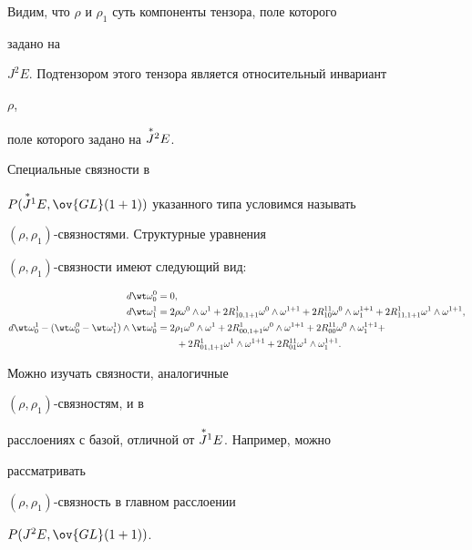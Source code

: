Видим, что $\rho$ и $\rho_1$ суть компоненты тензора, поле которого 


задано на 


$J^2E$. Подтензором этого тензора является относительный инвариант 


$\rho$, 


поле которого задано на $\overset{\,*}{J}{}^2E$. 


 


Специальные связности в 


$P(\up{\,*}{J}^1 E,\ov{GL}(1+1))$ указанного типа условимся называть 


$(\rho,\rho_1)$-связностями. Структурные уравнения 


$(\rho,\rho_1)$-связности имеют следующий вид: 


\begin{align*} 


d\wt\omega^0_0&=0,\\ 


d\wt\omega^1_1&=2\rho\omega^0\wedge\omega^1+2R^1_{10,1+1}\omega^0 


\wedge\omega^{1+1}+2R^{11}_{10}\omega^0\wedge\omega^{1+1}_1+ 


2R^1_{11,1+1}\omega^1\wedge\omega^{1+1},\\ 


d\wt\omega^1_0-(\wt\omega^0_0-\wt\omega^1_1)\wedge 


\wt\omega^1_0&=2\rho_1\omega^0\wedge\omega^1+ 


2R^1_{00,1+1}\omega^0\wedge\omega^{1+1}+ 


2R^{11}_{00}\omega^0\wedge\omega^{1+1}_1+ \\


&\qquad +2R^1_{01,1+1}\omega^1\wedge\omega^{1+1}+ 


2R^{11}_{01}\omega^1\wedge\omega^{1+1}_1. 


\end{align*} 


 


\begin{note} Можно изучать связности, аналогичные 


$(\rho,\rho_1)$-связностям, и в 


расслоениях с базой, отличной от $\overset{\,*}{J}{}^1E$. Например, можно 


рассматривать 


$(\rho,\rho_1)$-связность в главном расслоении 


$P(J^2 E,\ov{GL}(1+1))$. 


\end{note} 


